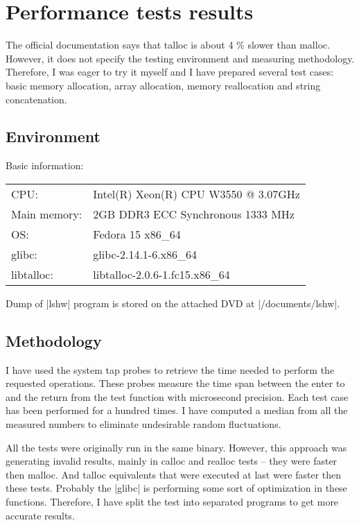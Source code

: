 \chapter{Performance tests results}

The official documentation says that talloc is about 4 \% slower than
malloc\cite{TallocDoc}. However, it does not specify the testing environment and
measuring methodology. Therefore, I was eager to try it myself and I have
prepared several test cases: basic memory allocation, array allocation, memory
reallocation and string concatenation.

\section{Environment}

Basic information:

\begin{table}[h]
  \begin{tabular}{l l}
  CPU: & Intel(R) Xeon(R) CPU W3550  @ 3.07GHz \\
  Main memory: & 2GB DDR3 ECC Synchronous 1333 MHz \\
  OS: & Fedora 15 x86_64 \\
  glibc: & glibc-2.14.1-6.x86_64 \\
  libtalloc: & libtalloc-2.0.6-1.fc15.x86_64
  \end{tabular}
\end{table}

\noindent
Dump of |lshw| program is stored on the attached DVD at |/documents/lshw|.

\section{Methodology}

I have used the system tap probes to retrieve the time needed to perform the
requested operations. These probes measure the time span between the enter to
and the return from the test function with microsecond precision. Each test case
has been performed for a hundred times. I have computed a median from all the
measured numbers to eliminate undesirable random fluctuations.

All the tests were originally run in the same binary. However, this approach was
generating invalid results, mainly in calloc and realloc tests -- they were
faster then malloc. And talloc equivalents that were executed at last were
faster then these tests. Probably the |glibc| is performing some sort of
optimization in these functions. Therefore, I have split the test into
separated programs to get more accurate results.

